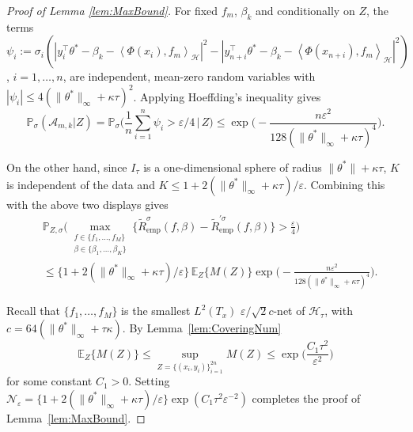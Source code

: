 \documentclass[twoside, onecolumn]{article}
\def\E{\mathbb{E}}
\def\varep{\varepsilon}
\def\Hcal{\mathcal{H}}
\def\Acal{\mathcal{A}}
\def\Hcal{\mathcal{H}}
\newtheorem{lemma}{Lemma}
\begin{document}
\begin{proof}[Proof of Lemma \ref{lem:MaxBound}]
For fixed $f_m$, $\beta_k$ and conditionally on $Z$, the terms
$\psi_{i}:=\sigma_{i}(|y_{i}^\top \theta^*-\beta_{k}-\left<\Phi(x_{i}), f_{m}\right>_\Hcal|^{2}-
|y_{n+i}^\top\theta^*-\beta_{k}-\left<\Phi(x_{n+i}), f_{m}\right>_\Hcal|^{2})$, $i=1, \dots, n$, 
are independent, mean-zero random variables with $|\psi_i|\leq  4(\|\theta^*\|_\infty+\kappa \tau)^{2}$.
Applying Hoeffding's inequality gives
$$
\mathbb{P}_{\sigma}(\Acal_{m,k}|Z) = \mathbb{P}_{\sigma}\Big(\frac1{n}\sum_{i=1}^n \psi_i > \varepsilon / 4\,\Big|\, Z\Big) \leq \exp\Big(-  \frac{n\varepsilon^2}{128(\|\theta^*\|_\infty+\kappa \tau)^{4}}\Big).%
$$

On the other hand, since $I_{\tau}$ is a one-dimensional sphere of radius $\|\theta^*\| + \kappa \tau$, $K$ is independent of the data and $K \leq 1 + 2(\|\theta^*\|_\infty+\kappa \tau)/\varepsilon$. Combining this with the above two displays gives 
\begin{align*}
&\mathbb{P}_{Z,\sigma}\bigg(\max_{\substack{f\in \{f_1, \dots, f_M\}\\\beta\in \{\beta_1, \dots, \beta_K\}}}\{\widetilde{R}_{\text{emp}}^{\sigma}(f,\beta)-\widetilde{R}_{\text{emp}}^{'\sigma}(f,\beta)\}>\frac{\varepsilon}{4}\bigg)\\ &\leq \{1 + 2(\|\theta^*\|_\infty+\kappa \tau)/\varepsilon\}\,\E_Z\{M(Z)\}\exp\Big(-  \frac{n\varepsilon^2}{128(\|\theta^*\|_\infty+\kappa \tau)^{4}}\Big).
\end{align*}

Recall that $\{f_1, \dots, f_M\}$ is the smallest $L^2(T_x)$ $\varepsilon/\sqrt{2}c$-net of $\mathcal{H}_\tau$, with $c=64(\|\theta^\ast\|_\infty+\tau \kappa).$ By Lemma~\ref{lem:CoveringNum}
\begin{equation}\label{eq:UpperBoundCoveringNumber}
\mathbb{E}_Z\{M(Z)\}\leq \sup_{Z=\{(x_i, y_i)\}_{i=1}^{2n}} M(Z)\leq\exp\bigg(\frac{C_1\tau^2}{ \varepsilon^2}\bigg)
\end{equation}
for some constant $C_1>0$. Setting $\mathcal{N}_{\varep}=\{1+2(\|\theta^*\|_\infty+\kappa\tau)/\varep\} 
\exp( C_1\tau^2 \varepsilon^{-2})$ completes the proof of Lemma~\ref{lem:MaxBound}.
\end{proof}



\end{document}
